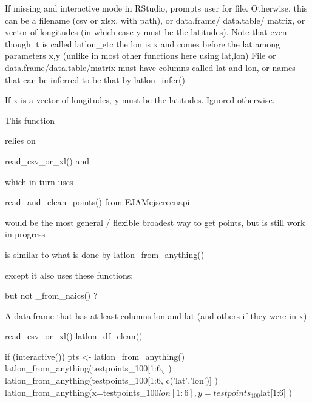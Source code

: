 \documentclass[a4paper]{book}
\begin{document}
%
\begin{Arguments}
\begin{ldescription}
\item[\code{x}] If missing and interactive mode in RStudio, prompts user for file. Otherwise,
this can be a filename (csv or xlsx, with path), or data.frame/ data.table/ matrix,
or vector of longitudes (in which case y must be the latitudes).
Note that even though it is called latlon\_etc the
lon is x and comes before the lat among parameters x,y (unlike in most other functions here using lat,lon)
File or data.frame/data.table/matrix must have columns called lat and lon, or names that can
be inferred to be that by latlon\_infer()

\item[\code{y}] If x is a vector of longitudes, y must be the latitudes. Ignored otherwise.
\end{ldescription}
\end{Arguments}
%
\begin{Details}\relax
This function

relies on

read\_csv\_or\_xl()  and

 which in turn uses   

read\_and\_clean\_points() from EJAMejscreenapi

would be the most general / flexible broadest way to get points, but is still work in progress

is similar to what is done by latlon\_from\_anything()

except it also uses these functions:


   but not  \_from\_naics() ?
\end{Details}
%
\begin{Value}
A data.frame that has at least columns lon and lat (and others if they were in x)
\end{Value}
%
\begin{SeeAlso}\relax
read\_csv\_or\_xl() latlon\_df\_clean()
\end{SeeAlso}
%
\begin{Examples}
\begin{ExampleCode}
 
 if (interactive()) {
 pts <- latlon_from_anything()
 }
 latlon_from_anything(testpoints_100[1:6,] )
 latlon_from_anything(testpoints_100[1:6, c('lat','lon')] )
 latlon_from_anything(x=testpoints_100$lon[1:6], y=testpoints_100$lat[1:6] )
\end{ExampleCode}
\end{Examples}
\end{document}
